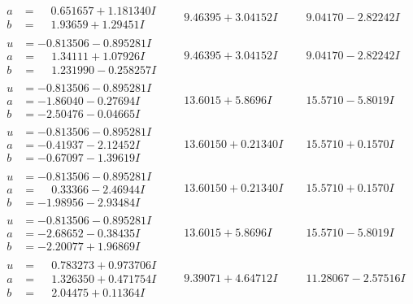 \documentclass[1p]{elsarticle_modified}
\theoremstyle{definition}
\begin{document}
$$\begin{array}{c|c|c}
\begin{aligned}
a &= \phantom{-}0.651657 + 1.181340 I \\
b &= \phantom{-}1.93659 + 1.29451 I\end{aligned}
 & \phantom{-}9.46395 + 3.04152 I & \phantom{-}9.04170 - 2.82242 I \\ \hline\begin{aligned}
u &= -0.813506 - 0.895281 I \\
a &= \phantom{-}1.34111 + 1.07926 I \\
b &= \phantom{-}1.231990 - 0.258257 I\end{aligned}
 & \phantom{-}9.46395 + 3.04152 I & \phantom{-}9.04170 - 2.82242 I \\ \hline\begin{aligned}
u &= -0.813506 - 0.895281 I \\
a &= -1.86040 - 0.27694 I \\
b &= -2.50476 - 0.04665 I\end{aligned}
 & \phantom{-}13.6015 + 5.8696 I & \phantom{-}15.5710 - 5.8019 I \\ \hline\begin{aligned}
u &= -0.813506 - 0.895281 I \\
a &= -0.41937 - 2.12452 I \\
b &= -0.67097 - 1.39619 I\end{aligned}
 & \phantom{-}13.60150 + 0.21340 I & \phantom{-}15.5710 + 0.1570 I \\ \hline\begin{aligned}
u &= -0.813506 - 0.895281 I \\
a &= \phantom{-}0.33366 - 2.46944 I \\
b &= -1.98956 - 2.93484 I\end{aligned}
 & \phantom{-}13.60150 + 0.21340 I & \phantom{-}15.5710 + 0.1570 I \\ \hline\begin{aligned}
u &= -0.813506 - 0.895281 I \\
a &= -2.68652 - 0.38435 I \\
b &= -2.20077 + 1.96869 I\end{aligned}
 & \phantom{-}13.6015 + 5.8696 I & \phantom{-}15.5710 - 5.8019 I \\ \hline\begin{aligned}
u &= \phantom{-}0.783273 + 0.973706 I \\
a &= \phantom{-}1.326350 + 0.471754 I \\
b &= \phantom{-}2.04475 + 0.11364 I\end{aligned}
 & \phantom{-}9.39071 + 4.64712 I & \phantom{-}11.28067 - 2.57516 I \\ \hline\begin{aligned}

\end{aligned}
\end{array}$$
\end{document}
